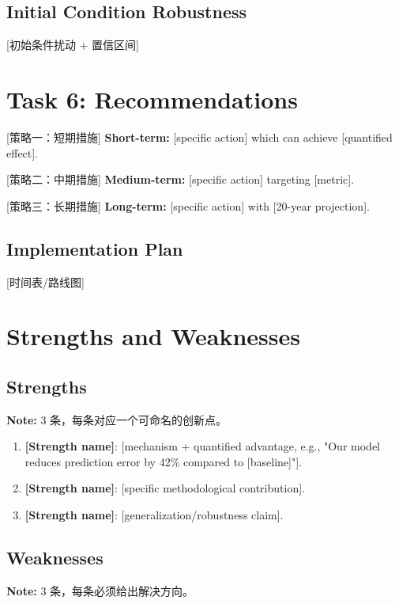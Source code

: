 \documentclass[12pt]{article}
\begin{document}
\subsection{Initial Condition Robustness}
[初始条件扰动 + 置信区间]

\section{Task 6: Recommendations}

[策略一：短期措施]
\textbf{Short-term:} [specific action] which can achieve [quantified effect].

[策略二：中期措施]
\textbf{Medium-term:} [specific action] targeting [metric].

[策略三：长期措施]
\textbf{Long-term:} [specific action] with [20-year projection].

\subsection{Implementation Plan}
[时间表/路线图]

\section{Strengths and Weaknesses}

\subsection{Strengths}
\textbf{Note:} 3 条，每条对应一个可命名的创新点。

\begin{enumerate}[leftmargin=*]
    \item \textbf{[Strength name]}: [mechanism + quantified advantage, e.g., "Our model reduces
    prediction error by 42\% compared to [baseline]"].
    \item \textbf{[Strength name]}: [specific methodological contribution].
    \item \textbf{[Strength name]}: [generalization/robustness claim].
\end{enumerate}

\subsection{Weaknesses}
\textbf{Note:} 3 条，每条必须给出解决方向。
\end{document}
